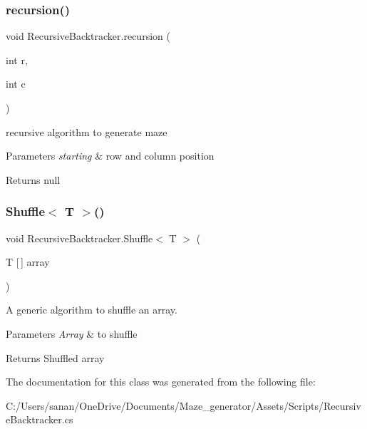\subsubsection{\texorpdfstring{recursion()}{recursion()}}
{\footnotesize\ttfamily void Recursive\+Backtracker.\+recursion (\begin{DoxyParamCaption}\item[{int}]{r,  }\item[{int}]{c }\end{DoxyParamCaption})}



recursive algorithm to generate maze 


\begin{DoxyParams}{Parameters}
{\em starting} & row and column position\\
\hline
\end{DoxyParams}
\begin{DoxyReturn}{Returns}
null 
\end{DoxyReturn}
\mbox{\label{class_recursive_backtracker_a982f5e5e9fc3e26f59d0f63d23c2e867}} 
\subsubsection{\texorpdfstring{Shuffle$<$ T $>$()}{Shuffle< T >()}}
{\footnotesize\ttfamily void Recursive\+Backtracker.\+Shuffle$<$ T $>$ (\begin{DoxyParamCaption}\item[{T \mbox{[}$\,$\mbox{]}}]{array }\end{DoxyParamCaption})}



A generic algorithm to shuffle an array. 


\begin{DoxyParams}{Parameters}
{\em Array} & to shuffle\\
\hline
\end{DoxyParams}
\begin{DoxyReturn}{Returns}
Shuffled array 
\end{DoxyReturn}


The documentation for this class was generated from the following file\+:\begin{DoxyCompactItemize}
\item 
C\+:/\+Users/sanan/\+One\+Drive/\+Documents/\+Maze\+\_\+generator/\+Assets/\+Scripts/Recursive\+Backtracker.\+cs\end{DoxyCompactItemize}
